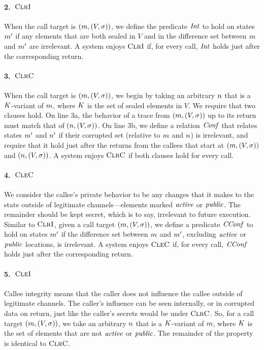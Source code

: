 \documentclass[10pt,conference]{ieeetran}%
\theoremstyle{definition}
\begin{document}
\paragraph*{2.~\(\textnormal{\sc ClrI}\)}
When the call target is \((m,(V,\sigma))\), we define the predicate \(\mathit{Int}\) to hold
on states \(m'\) if any elements that are both sealed in \(V\) and in the difference
set between \(m\) and \(m'\) are irrelevant. A system enjoys \(\textnormal{\sc ClrI}\) if, for every
call, \(\mathit{Int}\) holds just after the corresponding return.

\paragraph*{3.~\(\textnormal{\sc ClrC}\)}
When the call target is \((m,(V,\sigma))\), we begin by taking an arbitrary \(n\)
that is a \(K\)-variant of \(m\), where \(K\) is the set of sealed elements
in \(V\). We require that two clauses hold. On line 3a, the behavior of a trace from
\((m,(V,\sigma))\) up to its return must match that of \((n,(V,\sigma))\).
On line 3b, we define a relation \(\mathit{Conf}\) that relates states \(m'\) and \(n'\)
if their corrupted set (relative to \(m\) and \(n\)) is irrelevant, and require
that it hold just after the returns from the callees that start at \((m,(V,\sigma))\) and \((n,(V,\sigma))\).
A system enjoys \(\textnormal{\sc ClrC}\) if both clauses hold for every call.

\paragraph*{4.~\(\textnormal{\sc CleC}\)}
We consider the callee's private behavior to be any changes that it makes to the state
outside of legitimate channels---elements marked \(\mathit{active}\) or \(\mathit{public}\). The remainder
should be kept secret, which is to say, irrelevant to future execution. Similar to \(\textnormal{\sc ClrI}\), given a call target
\((m,(V,\sigma))\), we define a predicate \(\mathit{CConf}\) to hold
on states \(m'\) if the difference set between \(m\) and \(m'\), excluding
\(\mathit{active}\) or \(\mathit{public}\) locations, is irrelevant.
A system enjoys \(\textnormal{\sc CleC}\) if, for every call, \(\mathit{CConf}\) holds just after the corresponding return.

\paragraph*{5.~\(\textnormal{\sc CleI}\)}
Callee integrity means that the caller does not influence the callee outside of legitimate
channels. The caller's influence can be seen internally, or in corrupted data on return,
just like the caller's secrets would be under \(\textnormal{\sc ClrC}\). So, for a call target
\((m,(V,\sigma))\), we take an arbitrary \(n\) that is a \(K\)-variant
of \(m\), where \(K\) is the set of elements that are not \(\mathit{active}\)
or \(\mathit{public}\). The remainder of the property is identical to \(\textnormal{\sc ClrC}\).
\end{document}
